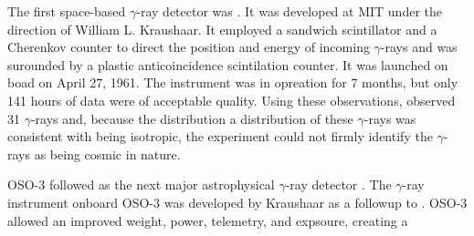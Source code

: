 


The first space-based $\gamma$-ray detector was \explorerxi
\cite{explorer_xi_kraushaar_1965}.  It was developed at \ac{MIT}
under the direction of William L. Kraushaar.  It employed a sandwich
scintillator and a Cherenkov counter to direct the position and energy
of incoming $\gamma$-rays and was surounded by a plastic anticoincidence
scintilation counter.  It was launched on boad \explorerxi on April 27,
1961.  The instrument was in opreation for 7 months, but only 141 hours
of data were of acceptable quality.  Using these observations, \explorerxi
observed 31 $\gamma$-rays and, because the distribution a distribution of
these $\gamma$-rays was consistent with being isotropic, the experiment
could not firmly identify the $\gamma$-rays as being cosmic in nature.




\ac{OSO-3} followed \explorerxi as the next major 
astrophysical $\gamma$-ray 
detector \cite{oso_3_kraushaar_1972}. 
The $\gamma$-ray instrument onboard \ac{OSO-3} 
was 
developed by Kraushaar as a followup to \explorerxi.
\ac{OSO-3} allowed an improved weight, power, telemetry, and
expsoure, creating a 

